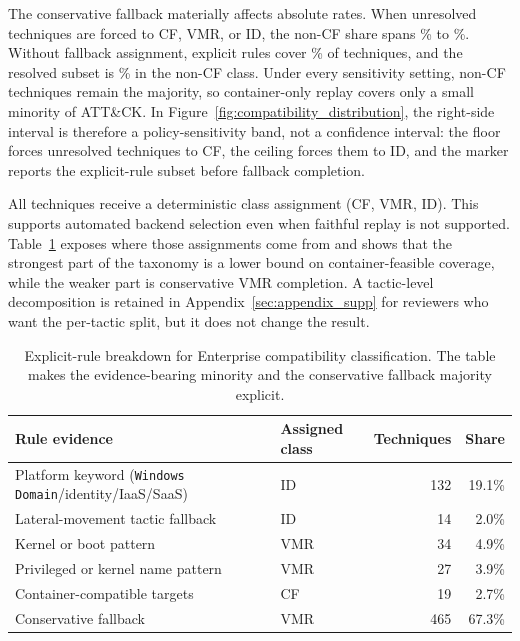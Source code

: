 \documentclass[sigconf]{acmart}
\begin{document}
The conservative fallback materially affects absolute rates. When unresolved techniques are forced to CF, VMR, or ID, the non-CF share spans \compatibilitynoncffloorpercentage\% to \compatibilitynoncfceilingpercentage\%. Without fallback assignment, explicit rules cover \compatibilityrulecoveragepercentage\% of techniques, and the resolved subset is \compatibilitynoncfresolvedpercentage\% in the non-CF class. Under every sensitivity setting, non-CF techniques remain the majority, so container-only replay covers only a small minority of ATT\&CK. In Figure~\ref{fig:compatibility_distribution}, the right-side interval is therefore a policy-sensitivity band, not a confidence interval: the floor forces unresolved techniques to CF, the ceiling forces them to ID, and the marker reports the explicit-rule subset before fallback completion.

All \enterpriseplatformcount{} techniques receive a deterministic class assignment (CF, VMR, ID). This supports automated backend selection even when faithful replay is not supported. Table~\ref{tab:compatibility_rule_breakdown} exposes where those assignments come from and shows that the strongest part of the taxonomy is a lower bound on container-feasible coverage, while the weaker part is conservative VMR completion. A tactic-level decomposition is retained in Appendix~\ref{sec:appendix_supp} for reviewers who want the per-tactic split, but it does not change the result.

\begin{table}[!htb]
\caption{Explicit-rule breakdown for Enterprise compatibility classification. The table makes the evidence-bearing minority and the conservative fallback majority explicit.}\label{tab:compatibility_rule_breakdown}
\centering\small
\begin{tabular}{@{}>{\raggedright\arraybackslash}p{2.7cm}>{\raggedright\arraybackslash}p{2.3cm}rr@{}}
\toprule
\textbf{Rule evidence} & \textbf{Assigned class} & \textbf{Techniques} & \textbf{Share} \\
\midrule
Platform keyword (\texttt{Windows Domain}/identity/IaaS/SaaS) & ID & 132 & 19.1\% \\
Lateral-movement tactic fallback & ID & 14 & 2.0\% \\
Kernel or boot pattern & VMR & 34 & 4.9\% \\
Privileged or kernel name pattern & VMR & 27 & 3.9\% \\
Container-compatible targets & CF & 19 & 2.7\% \\
Conservative fallback & VMR & 465 & 67.3\% \\
\bottomrule
\end{tabular}
\end{table}
\end{document}

